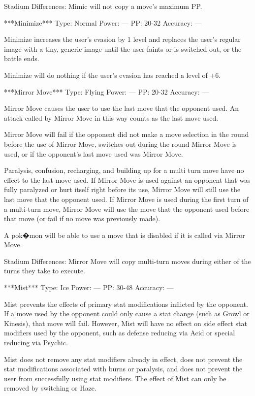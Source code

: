 \documentclass[reprint, aps, prl, paper=A4]{revtex4-1}
\begin{document}
Stadium Differences:
Mimic will not copy a move's maximum PP.


***Minimize***
Type: Normal
Power: ---
PP: 20-32
Accuracy: ---

Minimize increases the user's evasion by 1 level and replaces the user's regular image with a
tiny, generic image until the user faints or is switched out, or the battle ends.

Minimize will do nothing if the user's evasion has reached a level of +6.


***Mirror Move***
Type: Flying
Power: ---
PP: 20-32
Accuracy: ---

Mirror Move causes the user to use the last move that the opponent used. An attack called by
Mirror Move in this way counts as the last move used.

Mirror Move will fail if the opponent did not make a move selection in the round before the use
of Mirror Move, switches out during the round Mirror Move is used, or if the opponent's last
move used was Mirror Move.

Paralysis, confusion, recharging, and building up for a multi turn move have no effect to the
last move used. If Mirror Move is used against an opponent that was fully paralyzed or hurt
itself right before its use, Mirror Move will still use the last move that the opponent used.
If Mirror Move is used during the first turn of a multi-turn move, Mirror Move will use the
move that the opponent used before that move (or fail if no move was previously made).

A pok�mon will be able to use a move that is disabled if it is called via Mirror Move.

Stadium Differences:
Mirror Move will copy multi-turn moves during either of the turns they take to execute.


***Mist***
Type: Ice
Power: ---
PP: 30-48
Accuracy: ---

Mist prevents the effects of primary stat modifications inflicted by the opponent. If a move
used by the opponent could only cause a stat change (such as Growl or Kinesis), that move will
fail. However, Mist will have no effect on side effect stat modifiers used by the opponent,
such as defense reducing via Acid or special reducing via Psychic.

Mist does not remove any stat modifiers already in effect, does not prevent the stat
modifications associated with burns or paralysis, and does not prevent the user from
successfully using stat modifiers. The effect of Mist can only be removed by switching or Haze.
\end{document}
